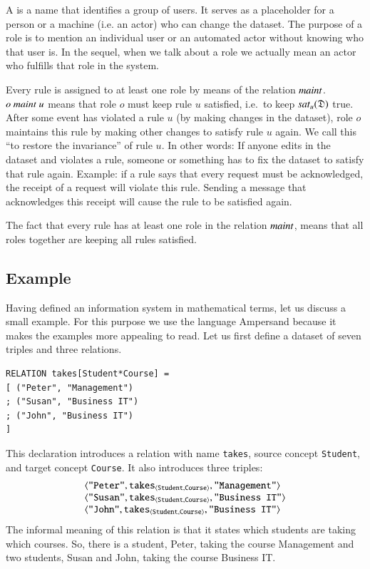 \documentclass{elsarticle}
\begin{document}

   A  is a name that identifies a group of users.
   It serves as a placeholder for a person or a machine (i.e. an actor) who can change the dataset.
   The purpose of a role is to mention an individual user or an automated actor without knowing who that user is.
   In the sequel, when we talk about a role we actually mean an actor who fulfills that role in the system.

   Every rule is assigned to at least one role by means of the relation $\text{\it maint\/}$.
   $o\ \text{\it maint\/}\ u$ means that role $o$ must keep rule $u$ satisfied, i.e.\ to keep $\text{\it sat\/}_{u}(\mathfrak{D})$ true.
   After some event has violated a rule $u$ (by making changes in the dataset),
   role $o$ maintains this rule by making other changes to satisfy rule $u$ again.
   We call this ``to restore the invariance'' of rule $u$.
   In other words: If anyone edits in the dataset and violates a rule, someone or something has to fix the dataset to satisfy that rule again.
   Example: if a rule says that every request must be acknowledged, the receipt of a request will violate this rule.
   Sending a message that acknowledges this receipt will cause the rule to be satisfied again.

   The fact that every rule has at least one role in the relation $\text{\it maint\/}$, means that all roles together are keeping all rules satisfied.

\subsection{Example}
\label{old IS}
   Having defined an information system in mathematical terms, let us discuss a small example.
   For this purpose we use the language Ampersand
   because it makes the examples more appealing to read.
   Let us first define a dataset of seven triples and three relations.
\begin{verbatim}
RELATION takes[Student*Course] =
[ ("Peter", "Management")
; ("Susan", "Business IT")
; ("John", "Business IT")
]
\end{verbatim}
   This declaration introduces a relation with name \verb#takes#,
   source concept \verb#Student#, and
   target concept \verb#Course#.
   It also introduces three triples:
\[\begin{array}{l}
   \langle{\text{\tt "Peter"}},{\text{\it \text{\tt takes}\/}_{\langle{\text{\tt Student}},{\text{\tt Course}}\rangle}},{\text{\tt "Management"}}\rangle\\
   \langle{\text{\tt "Susan"}},{\text{\it \text{\tt takes}\/}_{\langle{\text{\tt Student}},{\text{\tt Course}}\rangle}},{\text{\tt "Business IT"}}\rangle\\
   \langle{\text{\tt "John"}},{\text{\it \text{\tt takes}\/}_{\langle{\text{\tt Student}},{\text{\tt Course}}\rangle}},{\text{\tt "Business IT"}}\rangle
\end{array}\]
   The informal meaning of this relation is that it states which students are taking which courses.
   So, there is a student, Peter, taking the course Management and two students, Susan and John, taking the course Business IT.
\end{document}
